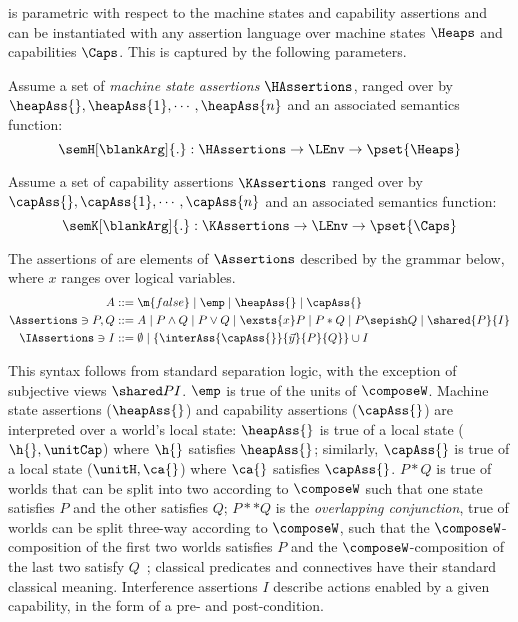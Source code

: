 \colosl is parametric with respect to the machine states and capability assertions and can be instantiated with any assertion language over machine states $\Heaps$ and capabilities $\Caps$. This is captured by the following parameters.
%
%
\begin{parameter}
Assume a set of \emph{machine state assertions} $\HAssertions$, ranged over by $\heapAss{}, \heapAss{1}, \cdots, \heapAss{n}$ and an associated semantics function:
%
\[
	\semH[\blankArg]{.} : \HAssertions \rightarrow \LEnv \rightarrow \pset{\Heaps}
\]
%
\end{parameter}
%
%
\begin{parameter}
Assume a set of capability assertions $\KAssertions$ ranged over by $\capAss{}, \capAss{1}, \cdots, \capAss{n}$ and an associated semantics function:
%
\[
	\semK[\blankArg]{.} : \KAssertions \rightarrow \LEnv \rightarrow \pset{\Caps}
\]
%
\end{parameter}
%
%
\begin{definition}\label{def:assertions}
The assertions of \colosl are elements of $\Assertions$ described by the grammar below, where $x$ ranges over logical variables.
%
\begin{align*}
	A &::=\m{false} \mid  \emp \mid \heapAss{} \mid \capAss{}\\
	\Assertions \ni P, Q  &::=  A \mid P \land Q \mid P \lor Q \mid \exsts{x} P \mid P * Q \mid P \sepish Q \mid \shared{P}{I} \\
	\IAssertions \ni I &::= \emptyset \mid \{\interAss{\capAss{}}{\vec{y}}{P}{Q}\} \cup I
\end{align*}
\end{definition}

This syntax follows from standard separation logic, with the exception of subjective views $\shared P
I$. $\emp$ is true of the units of $\composeW$. Machine state assertions ($\heapAss{}$) and capability assertions ($\capAss{}$) are interpreted over a world's local state: $\heapAss{}$ is true of a local state ($\h{}, \unitCap$) where $\h{}$ satisfies $\heapAss{}$; similarly, $\capAss{}$ is true of a local state ($\unitH, \ca{}$) where $\ca{}$ satisfies $\capAss{}$.
$P * Q$ is true of worlds that can be split into two according to $\composeW$ such that one state satisfies $P$ and the other satisfies $Q$; $P**Q$ is the \emph{overlapping conjunction}, true of worlds can be split three-way
according to $\composeW$, such that the $\composeW$-composition of the first two worlds satisfies $P$ and the $\composeW$-composition of the last two satisfy $Q$~\cite{rey-slnotes}; classical predicates and connectives have their standard classical meaning. Interference assertions $I$ describe actions enabled by a given capability, in the form of a pre- and post-condition.

